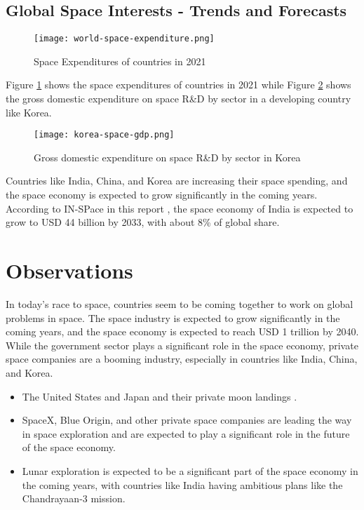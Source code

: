 \documentclass[12pt]{article}
\begin{document}
\subsection{Global Space Interests - Trends and Forecasts}

\begin{figure}[h]
    \centering
    \texttt{[image: world-space-expenditure.png]}
    \caption{Space Expenditures of countries in 2021}
    \label{fig:space-interests}
\end{figure}

Figure \ref{fig:space-interests} shows the space expenditures of countries in 2021 while Figure \ref{fig:korea-space-gdp} shows the gross domestic expenditure on space R\&D by sector in a developing country like Korea.

\begin{figure}[h]
    \centering
    \texttt{[image: korea-space-gdp.png]}
    \caption{Gross domestic expenditure on space R\&D by sector in Korea}
    \label{fig:korea-space-gdp}
\end{figure}

Countries like India, China, and Korea are increasing their space spending, and the space economy is expected to grow significantly in the coming years. According to IN-SPace in this report \cite{news:thehindu}, the space economy of India is expected to grow to USD 44 billion by 2033, with about 8\% of global share.

\section{Observations}

In today's race to space, countries seem to be coming together to work on global problems in space. The space industry is expected to grow significantly in the coming years, and the space economy is expected to reach USD 1 trillion by 2040. While the government sector plays a significant role in the space economy, private space companies are a booming industry, especially in countries like India, China, and Korea. 
\begin{itemize}
    \item The United States and Japan and their private moon landings \cite{news:nikkeiasia}. 
    \item SpaceX, Blue Origin, and other private space companies are leading the way in space exploration and are expected to play a significant role in the future of the space economy.
    \item Lunar exploration is expected to be a significant part of the space economy in the coming years, with countries like India having ambitious plans like the Chandrayaan-3 mission.
\end{itemize}
\end{document}
